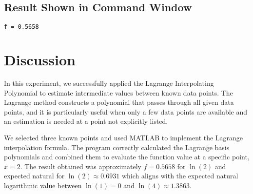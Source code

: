 \documentclass[a4paper,12pt]{article}
\begin{document}
	
	
	
	\subsection{Result Shown in Command Window}
	
	\begin{lstlisting}[style=vscode-light, caption={Command Window for Finding intermediate points using Lagrange Interpolating Polynomial} ]
f = 0.5658
	\end{lstlisting}
	
	
	
\section{Discussion}
In this experiment, we successfully applied the Lagrange Interpolating Polynomial to estimate intermediate values between known data points. The Lagrange method constructs a polynomial that passes through all given data points, and it is particularly useful when only a few data points are available and an estimation is needed at a point not explicitly listed.

We selected three known points and used MATLAB to implement the Lagrange interpolation formula. The program correctly calculated the Lagrange basis polynomials and combined them to evaluate the function value at a specific point, $x = 2$. The result obtained was approximately $f = 0.5658$ for $\ln(2)$ and expected natural for $\ln(2) \approx 0.6931$ which aligns with the expected natural logarithmic value between $\ln(1) = 0$ and $\ln(4) \approx 1.3863$.



	
	
	
	
	
	
\end{document}
